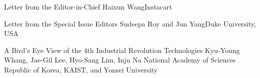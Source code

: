 \documentclass[11pt]{article}
\begin{document}


\begin{bulletin}


%
%

\begin{lettersection}


\begin{letter}{Letter from the Editor-in-Chief}
{Haixun Wang}{Instacart}

\end{letter}
%
\newpage
%
%
\begin{letter}{Letter from the Special Issue Editors} 
{Sudeepa Roy and Jun Yang}{Duke University, USA}


\end{letter}


\end{lettersection}

\begin{opinionsection}
\begin{opinion}{A Bird’s Eye View of the 4th Industrial Revolution Technologies}
  {Kyu-Young Whang, Jae-Gil Lee, Hyo-Sang Lim, Inju Na}
  {National Academy of Sciences Republic of Korea, KAIST, and Yonsei University}

\end{opinion}
\end{opinionsection}


\end{bulletin}
\end{document}
